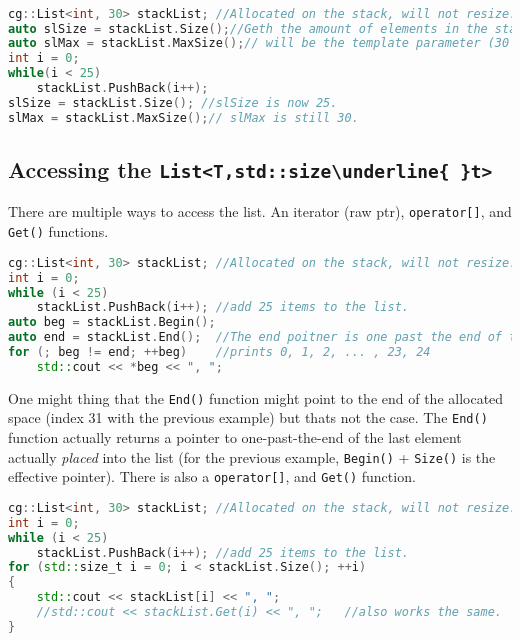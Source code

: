 \documentclass{article}
\newcommand{\theobj}{\protect\Verb+List<T,std::size\underline{ }t> +}
\begin{document}
\begin{lstlisting}[language=C++, label=code:2, caption=Size() and MaxSize() of stackList]

cg::List<int, 30> stackList; //Allocated on the stack, will not resize.
auto slSize = stackList.Size();//Geth the amount of elements in the stackList.  May be  the size of the template paramter or less.
auto slMax = stackList.MaxSize();// will be the template parameter (30 in this example).
int i = 0;
while(i < 25)
	stackList.PushBack(i++);
slSize = stackList.Size(); //slSize is now 25.
slMax = stackList.MaxSize();// slMax is still 30.

\end{lstlisting}
\pagebreak
\subsection{Accessing the \theobj}

There are multiple ways to access the list. An iterator (raw ptr), \Verb+operator[]+, and \Verb+Get()+ functions.


\begin{lstlisting}[language=C++, label=code:2, caption=Accessing via iterators]
cg::List<int, 30> stackList; //Allocated on the stack, will not resize.
int i = 0;
while (i < 25)
	stackList.PushBack(i++); //add 25 items to the list.
auto beg = stackList.Begin();
auto end = stackList.End();  //The end poitner is one past the end of the size, and not the max sie.
for (; beg != end; ++beg)    //prints 0, 1, 2, ... , 23, 24
	std::cout << *beg << ", ";
\end{lstlisting}

One might thing that the \Verb+End()+ function might point to the end of the allocated space (index 31 with the previous example) but thats not the case.  The \Verb+End()+ function actually returns a pointer to one-past-the-end of the last element actually \textit{placed} into the list (for the previous example, \Verb+Begin()+ + \Verb+Size()+ is the effective pointer). There is also a \Verb+operator[]+, and \Verb+Get()+ function.

\begin{lstlisting}[language=C++, label=code:2, caption=Accessing via Get() and square bracket operator]
cg::List<int, 30> stackList; //Allocated on the stack, will not resize.
int i = 0;
while (i < 25)
	stackList.PushBack(i++); //add 25 items to the list.
for (std::size_t i = 0; i < stackList.Size(); ++i)
{
	std::cout << stackList[i] << ", ";
	//std::cout << stackList.Get(i) << ", ";   //also works the same.
}
\end{lstlisting}
\end{document}
